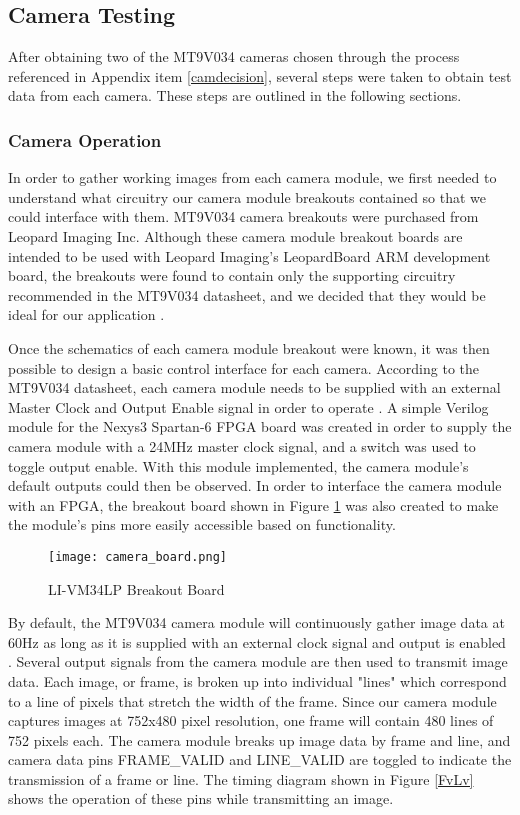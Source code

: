 \subsection{Camera Testing}
After obtaining two of the MT9V034 cameras chosen through the process referenced in Appendix item \ref{camdecision}, several steps were taken to obtain test data from each camera. These steps are outlined in the following sections.

\subsubsection{Camera Operation}
In order to gather working images from each camera module, we first needed to understand what circuitry our camera module breakouts contained so that we could interface with them. MT9V034 camera breakouts were purchased from Leopard Imaging Inc. Although these camera module breakout boards are intended to be used with Leopard Imaging's LeopardBoard ARM development board, the breakouts were found to contain only the supporting circuitry recommended in the MT9V034 datasheet, and we decided that they would be ideal for our application \cite{livm34lp,mt9v034}. 
\par
Once the schematics of each camera module breakout were known, it was then possible to design a basic control interface for each camera. According to the MT9V034 datasheet, each camera module needs to be supplied with an external Master Clock and Output Enable signal in order to operate \cite{mt9v034}. A simple Verilog module for the Nexys3 Spartan-6 FPGA board was created in order to supply the camera module with a 24MHz master clock signal, and a switch was used to toggle output enable. With this module implemented, the camera module's default outputs could then be observed. In order to interface the camera module with an FPGA, the breakout board shown in Figure \ref{camBreakoutBoard} was also created to make the module's pins more easily accessible based on functionality. 

\begin{figure}[H]
	\centerline{\texttt{[image: camera\_board.png]}}
	\caption{LI-VM34LP Breakout Board}
	\label{camBreakoutBoard}
\end{figure}

\par
By default, the MT9V034 camera module will continuously gather image data at 60Hz  as long as it is supplied with an external clock signal and output is enabled \cite{mt9v034}. Several output signals from the camera module are then used to transmit image data. Each image, or frame, is broken up into individual "lines" which correspond to a line of pixels that stretch the width of the frame. Since our camera module captures images at 752x480 pixel resolution, one frame will contain 480 lines of 752 pixels each. The camera module breaks up image data by frame and line, and camera data pins FRAME\_VALID and LINE\_VALID are toggled to indicate the transmission of a frame or line. The timing diagram shown in Figure \ref{FvLv} shows the operation of these pins while transmitting an image.

